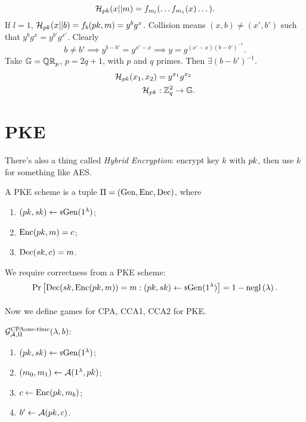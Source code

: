 \begin{equation*}
	\mathcal{H}_{pk}(x || m) = f_{m_l}( \dots f_{m_1} (x) \dots).
\end{equation*}
If $l = 1$, $\mathcal{H}_{pk}(x || b) = f_b(pk, m) = y^{b} g^x$.
Collision means $(x, b) \neq (x', b')$ such that $y^b g^x = y^{b'} g^{x'}$.
Clearly
\begin{equation*}
	b \neq b' \implies y^{b-b'} = g^{x'-x} \implies y = g^{(x'-x)(b-b')^{-1}}.
\end{equation*}
Take $\mathbb{G} = \mathbb{QR}_{p}$, $p = 2q + 1$, with $p$ and $q$ primes.
Then $\exists (b - b')^{-1}$.
\begin{align*}
	\mathcal{H}_{pk}(x_1, x_2) & = y^{x_1} g^{x_2} \\
	\mathcal{H}_{pk} & : \mathbb{Z}_q^2 \to \mathbb{G}.
\end{align*}

\section{\acl{PKE}}


There's also a thing called \emph{Hybrid Encryption}: encrypt key $k$ with $pk$, then use $k$ for something like \ac{AES}.

\begin{definition}
	A \ac{PKE} scheme is a tuple $\Pi = \left( \mathrm{Gen} , \allowbreak \mathrm{Enc} , \allowbreak \mathrm{Dec} \right)$, where
	\begin{enumerate}
		\item $(pk, sk) \leftarrow {\scriptstyle \$} {\mathrm{Gen}(1^{\lambda})}$;
		\item $\mathrm{Enc}(pk, m) = c$;
		\item $\mathrm{Dec}(sk, c) = m$.
	\end{enumerate}
\end{definition}
We require correctness from a \ac{PKE} scheme:
\begin{equation*}
	\mathop{\mathrm{Pr}}\limits_{} \left[ {
		\mathrm{Dec}(sk, \mathrm{Enc}(pk, m)) = m : (pk, sk) \leftarrow {\scriptstyle \$} {\mathrm{Gen}(1^{\lambda})}
	} \right]
	= 1 - \mathrm{negl}\left({\lambda}\right).
\end{equation*}

Now we define games for \ac{CPA}, \ac{CCA}1, \ac{CCA}2 for \ac{PKE}.

\begin{definition}
	$\mathcal{G}_{\mathcal{A}, \Pi}^{\text{CPA \\ one-time}}(\lambda, b)$:
	\begin{enumerate}
		\item $(pk, sk) \leftarrow {\scriptstyle \$} {\mathrm{Gen}(1^{\lambda})}$;
		\item $(m_0, m_1) \leftarrow \mathcal{A}(1^{\lambda}, pk)$;
		\item $c \leftarrow \mathrm{Enc}(pk, m_b)$;
		\item $b' \leftarrow \mathcal{A}(pk, c)$. \qedhere
	\end{enumerate}
\end{definition}

